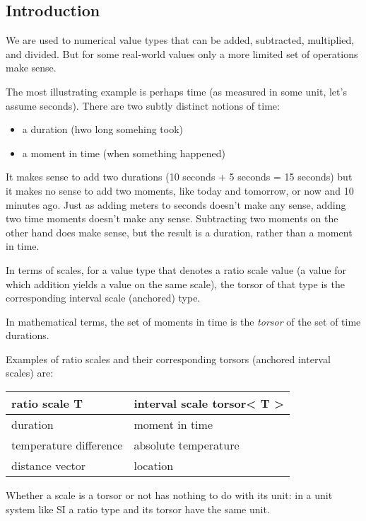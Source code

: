 \documentclass[]{article}
\providecommand{\tightlist}{%
  \setlength{\itemsep}{0pt}\setlength{\parskip}{0pt}}
\begin{document}
\hypertarget{introduction}{%
\subsection{Introduction}\label{introduction}}

We are used to numerical value types that can be added, subtracted,
multiplied, and divided. But for some real-world values only a more
limited set of operations make sense.

The most illustrating example is perhaps time (as measured in some unit,
let's assume seconds). There are two subtly distinct notions of time:

\begin{itemize}
\tightlist
\item
  a duration (hwo long somehing took)
\item
  a moment in time (when something happened)
\end{itemize}

It makes sense to add two durations (10 seconds + 5 seconds = 15
seconds) but it makes no sense to add two moments, like today and
tomorrow, or now and 10 minutes ago. Just as adding meters to seconds
doesn't make any sense, adding two time moments doesn't make any sense.
Subtracting two moments on the other hand does make sense, but the
result is a duration, rather than a moment in time.

In terms of scales, for a value type that denotes a ratio scale value (a
value for which addition yields a value on the same scale), the torsor
of that type is the corresponding interval scale (anchored) type.

In mathematical terms, the set of moments in time is the \emph{torsor}
of the set of time durations.

Examples of ratio scales and their corresponding torsors (anchored
interval scales) are:

\begin{longtable}[]{@{}ll@{}}
\toprule
ratio scale \textbf{T} & interval scale \textbf{torsor\textless{} T
\textgreater{}}\tabularnewline
\midrule
\endhead
duration & moment in time\tabularnewline
temperature difference & absolute temperature\tabularnewline
distance vector & location\tabularnewline
\bottomrule
\end{longtable}

Whether a scale is a torsor or not has nothing to do with its unit: in a
unit system like SI a ratio type and its torsor have the same unit.
\end{document}
